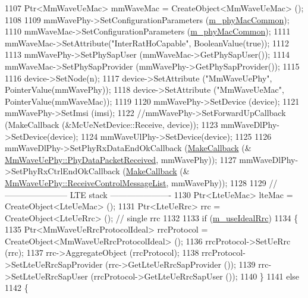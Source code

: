 \begin{DoxyCode}
1107         Ptr<MmWaveUeMac> mmWaveMac = CreateObject<MmWaveUeMac> ();
1108 
1109         mmWavePhy->SetConfigurationParameters (\hyperlink{classns3_1_1MmWaveHelper_a6aaa35de743b9a88998de0128b1046b4}{m\_phyMacCommon});
1110         mmWaveMac->SetConfigurationParameters (\hyperlink{classns3_1_1MmWaveHelper_a6aaa35de743b9a88998de0128b1046b4}{m\_phyMacCommon});
1111         mmWaveMac->SetAttribute(\textcolor{stringliteral}{"InterRatHoCapable"}, BooleanValue(\textcolor{keyword}{true}));
1112 
1113         mmWavePhy->SetPhySapUser (mmWaveMac->GetPhySapUser());
1114         mmWaveMac->SetPhySapProvider (mmWavePhy->GetPhySapProvider());
1115 
1116         device->SetNode(n);
1117         device->SetAttribute (\textcolor{stringliteral}{"MmWaveUePhy"}, PointerValue(mmWavePhy));
1118         device->SetAttribute (\textcolor{stringliteral}{"MmWaveUeMac"}, PointerValue(mmWaveMac));
1119 
1120         mmWavePhy->SetDevice (device);
1121         mmWavePhy->SetImsi (imsi); 
1122         \textcolor{comment}{//mmWavePhy->SetForwardUpCallback (MakeCallback (&McUeNetDevice::Receive, device));}
1123         mmWaveDlPhy->SetDevice(device);
1124         mmWaveUlPhy->SetDevice(device);
1125 
1126         mmWaveDlPhy->SetPhyRxDataEndOkCallback (\hyperlink{group__makecallbackmemptr_ga9376283685aa99d204048d6a4b7610a4}{MakeCallback} (&
      \hyperlink{classns3_1_1MmWaveUePhy_a439193d17fd93b179faa9db76f2b84af}{MmWaveUePhy::PhyDataPacketReceived}, mmWavePhy));
1127         mmWaveDlPhy->SetPhyRxCtrlEndOkCallback (\hyperlink{group__makecallbackmemptr_ga9376283685aa99d204048d6a4b7610a4}{MakeCallback} (&
      \hyperlink{classns3_1_1MmWaveUePhy_a1c3001d74628f40e38c1b4a04eac5015}{MmWaveUePhy::ReceiveControlMessageList}, mmWavePhy));
1128 
1129         \textcolor{comment}{// ----------------------- LTE stack ----------------------}
1130         Ptr<LteUeMac> lteMac = CreateObject<LteUeMac> ();
1131         Ptr<LteUeRrc> rrc = CreateObject<LteUeRrc> (); \textcolor{comment}{//  single rrc }
1132 
1133         \textcolor{keywordflow}{if} (\hyperlink{classns3_1_1MmWaveHelper_ad41fdb2996a6f53385b146bb60f476dc}{m\_useIdealRrc})
1134         \{
1135                 Ptr<MmWaveUeRrcProtocolIdeal> rrcProtocol = CreateObject<MmWaveUeRrcProtocolIdeal> ();
1136                 rrcProtocol->SetUeRrc (rrc);
1137                 rrc->AggregateObject (rrcProtocol);
1138                 rrcProtocol->SetLteUeRrcSapProvider (rrc->GetLteUeRrcSapProvider ());
1139                 rrc->SetLteUeRrcSapUser (rrcProtocol->GetLteUeRrcSapUser ());
1140         \}
1141         \textcolor{keywordflow}{else}
1142         \{

\end{DoxyCode}
